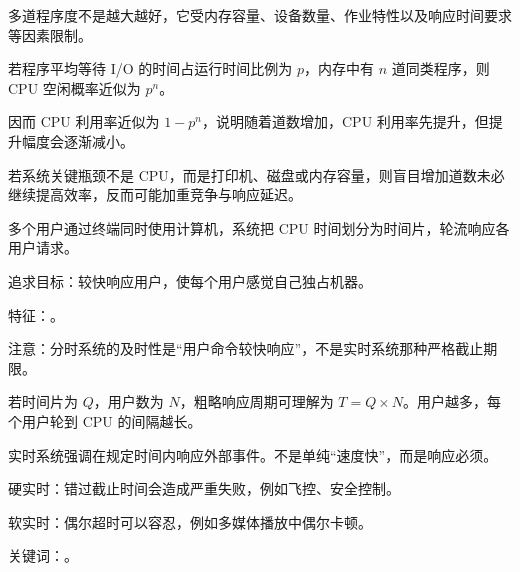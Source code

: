 \begin{points}
  \item 多道程序度不是越大越好，它受内存容量、设备数量、作业特性以及响应时间要求等因素限制。
  \item 若程序平均等待 I/O 的时间占运行时间比例为 $p$，内存中有 $n$ 道同类程序，则 CPU 空闲概率近似为 $p^n$。
  \item 因而 CPU 利用率近似为 $1-p^n$，说明随着道数增加，CPU 利用率先提升，但提升幅度会逐渐减小。
  \item 若系统关键瓶颈不是 CPU，而是打印机、磁盘或内存容量，则盲目增加道数未必继续提高效率，反而可能加重竞争与响应延迟。
\end{points}


\begin{points}
  \item 多个用户通过终端同时使用计算机，系统把 CPU 时间划分为时间片，轮流响应各用户请求。
  \item 追求目标：较快响应用户，使每个用户感觉自己独占机器。
  \item 特征：。
  \item 注意：分时系统的及时性是“用户命令较快响应”，不是实时系统那种严格截止期限。
  \item 若时间片为 $Q$，用户数为 $N$，粗略响应周期可理解为 $T=Q\times N$。用户越多，每个用户轮到 CPU 的间隔越长。
\end{points}


\begin{points}
  \item 实时系统强调在规定时间内响应外部事件。不是单纯“速度快”，而是响应必须。
  \item 硬实时：错过截止时间会造成严重失败，例如飞控、安全控制。
  \item 软实时：偶尔超时可以容忍，例如多媒体播放中偶尔卡顿。
  \item 关键词：。
\end{points}


